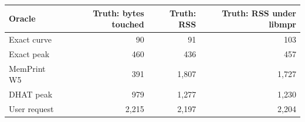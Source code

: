 \begin{tabular}{lrrr}
\toprule
Oracle & Truth: bytes touched & Truth: RSS & Truth: RSS under libmpr \\
\midrule
Exact curve & 90 & 91 & 103 \\
Exact peak & 460 & 436 & 457 \\
MemPrint W5 & 391 & 1{,}807 & 1{,}727 \\
DHAT peak & 979 & 1{,}277 & 1{,}230 \\
User request & 2{,}215 & 2{,}197 & 2{,}204 \\
\bottomrule
\end{tabular}
